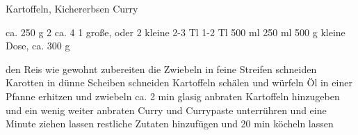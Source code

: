 \begin{recipe}{Kartoffeln, Kichererbsen Curry}

     ca. 250 g
     2
     ca. 4
     1 große, oder 2 kleine
     2-3 Tl
     1-2 Tl
     500 ml
     250 ml
     500 g
     kleine Dose, ca. 300 g
    \ingredient{}
    \ingredient{}

    \fourstar
    \ingredient{}
    \ingredient{}

     den Reis wie gewohnt zubereiten
     die Zwiebeln in feine Streifen schneiden
     Karotten in dünne Scheiben schneiden
     Kartoffeln schälen und würfeln
     Öl in einer Pfanne erhitzen und zwiebeln ca. 2 min glasig anbraten
     Kartoffeln hinzugeben und ein wenig weiter anbraten
     Curry und Currypaste unterrühren und eine Minute ziehen lassen
     restliche Zutaten hinzufügen und 20 min köcheln lassen

\end{recipe}